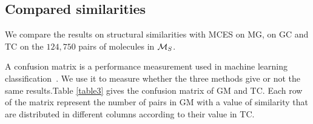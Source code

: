 \documentclass[10pt,letterpaper]{article}
\begin{document}
\subsection*{Compared similarities}


We compare the results on structural similarities with MCES on MG, on GC and TC on the $124,750$ pairs of molecules in ${\cal M}_S$. 


A confusion matrix is a performance measurement used in  machine learning classification~\cite{Santra2012}. We use it to measure whether the three methods give or not the same results.Table \ref{table3} gives the confusion matrix of GM and TC. Each row of the matrix represent the number of pairs in GM with a value of similarity that are distributed in different columns according to their value in TC.
\end{document}
